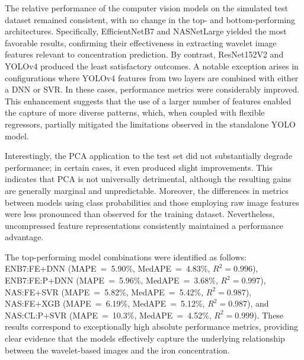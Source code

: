 \documentclass[10pt]{iopart}
\begin{document}
The relative performance of the computer vision models on the simulated test dataset remained consistent,
with no change in the top- and bottom-performing architectures.
Specifically, EfficientNetB7 and NASNetLarge yielded the most favorable results,
confirming their effectiveness in extracting wavelet image features relevant to concentration prediction.
By contrast, ResNet152V2 and YOLOv4 produced the least satisfactory outcomes.
A notable exception arises in configurations where YOLOv4 features from two layers are combined with either a DNN or SVR.
In these cases, performance metrics were considerably improved.
This enhancement suggests that the use of a larger number of features enabled the capture of more diverse patterns,
which, when coupled with flexible regressors, partially mitigated the limitations observed in the standalone YOLO model.

Interestingly, the PCA application to the test set did not substantially degrade performance;
in certain cases, it even produced slight improvements.
This indicates that PCA is not universally detrimental, although the resulting gains are generally marginal and unpredictable.
Moreover, the differences in metrics between models using class probabilities and those employing raw image features
were less pronounced than observed for the training dataset.
Nevertheless, uncompressed feature representations consistently maintained a performance advantage.

The top-performing model combinations were identified as follows:
ENB7:FE+DNN (MAPE~=~5.90\%,
MedAPE~=~4.83\%,
$R^2= 0.996$),
ENB7:FE:P+DNN
(MAPE~=~5.96\%,
MedAPE~=~3.68\%,
$R^2 = 0.997$),
NAS:FE+SVR
(MAPE~=~5.82\%,
MedAPE~=~5.42\%,
$R^2 = 0.987$),
NAS:FE+XGB
(MAPE~=~6.19\%,
MedAPE~=~5.12\%,
$R^2 = 0.987$),
and NAS:CL:P+SVR
(MAPE~=~10.3\%,
MedAPE~=~4.52\%,
$R^2 = 0.999$).
These results correspond to exceptionally high absolute performance metrics,
providing clear evidence that the models effectively capture
the underlying relationship between the wavelet-based images and the iron concentration.
\end{document}
